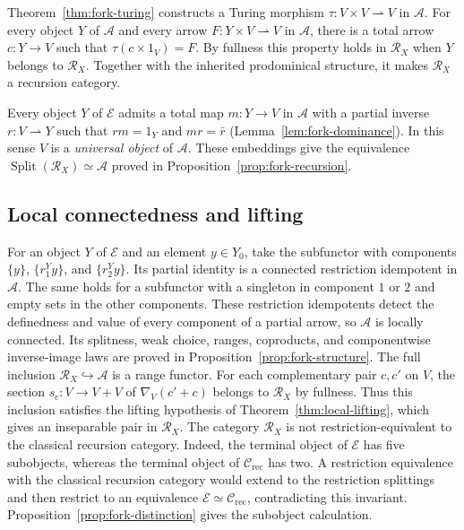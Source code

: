 \documentclass[11pt]{article}
\begin{document}
Theorem~\ref{thm:fork-turing} constructs a Turing morphism
$\tau:V\times V\rightharpoonup V$ in $\mathcal A$.
For every object $Y$ of $\mathcal A$ and every arrow
$F:Y\times V\rightharpoonup V$ in $\mathcal A$, there is a
total arrow $c:Y\to V$ such that $\tau(c\times1_V)=F$.
By fullness this property holds in $\mathscr R_X$ when
$Y$ belongs to $\mathscr R_X$. Together with the inherited
prodominical structure, it makes $\mathscr R_X$ a recursion category.

Every object $Y$ of $\mathcal E$ admits a total map $m:Y\to V$ in
$\mathcal A$ with a partial inverse $r:V\rightharpoonup Y$
such that $rm=1_Y$ and $mr=\bar r$
(Lemma~\ref{lem:fork-dominance}). In this sense $V$ is a
\emph{universal object} of $\mathcal A$.
These embeddings give the equivalence
$\operatorname{Split}(\mathscr R_X)\simeq\mathcal A$
proved in Proposition~\ref{prop:fork-recursion}.

\subsection{Local connectedness and lifting}

For an object $Y$ of $\mathcal E$ and an element $y\in Y_0$, take
the subfunctor with components $\{y\}$, $\{r_1^Yy\}$, and
$\{r_2^Yy\}$. Its partial identity is a connected restriction
idempotent in $\mathcal A$. The same holds for a subfunctor with
a singleton in component $1$ or $2$ and empty sets in the other
components. These restriction idempotents detect the definedness and value
of every component of a partial arrow, so $\mathcal A$ is locally
connected. Its splitness, weak choice, ranges, coproducts, and
componentwise inverse-image laws are proved in
Proposition~\ref{prop:fork-structure}.
The full inclusion $\mathscr R_X\hookrightarrow\mathcal A$ is a
range functor.
For each complementary pair $c,c'$ on $V$, the section
$s_c:V\to V+V$ of $\nabla_V(c'+c)$ belongs to $\mathscr R_X$
by fullness. Thus this inclusion satisfies the lifting hypothesis of
Theorem~\ref{thm:local-lifting}, which gives an inseparable pair in
$\mathscr R_X$.
The category $\mathscr R_X$ is not restriction-equivalent to the
classical recursion category. Indeed, the terminal object of
$\mathcal E$ has five subobjects, whereas the terminal object of
$\mathcal C_{\mathrm{rec}}$ has two.
A restriction equivalence with the classical recursion category
would extend to the restriction splittings and then restrict to an
equivalence $\mathcal E\simeq\mathcal C_{\mathrm{rec}}$, contradicting
this invariant. Proposition~\ref{prop:fork-distinction} gives the
subobject calculation.
\end{document}
